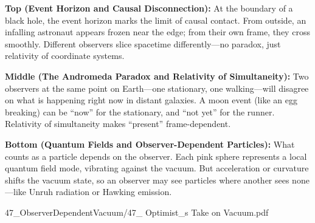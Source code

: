 \begin{SideNotePage}{
  \textbf{Top (Event Horizon and Causal Disconnection):}  
  At the boundary of a black hole, the event horizon marks the limit of causal contact. From outside, an infalling astronaut appears frozen near the edge; from their own frame, they cross smoothly. Different observers slice spacetime differently—no paradox, just relativity of coordinate systems. \par

  \textbf{Middle (The Andromeda Paradox and Relativity of Simultaneity):}  
  Two observers at the same point on Earth—one stationary, one walking—will disagree on what is happening right now in distant galaxies. A moon event (like an egg breaking) can be “now” for the stationary, and “not yet” for the runner. Relativity of simultaneity makes “present” frame-dependent. \par

  \textbf{Bottom (Quantum Fields and Observer-Dependent Particles):}  
  What counts as a particle depends on the observer. Each pink sphere represents a local quantum field mode, vibrating against the vacuum. But acceleration or curvature shifts the vacuum state, so an observer may see particles where another sees none—like Unruh radiation or Hawking emission. \par

}{47_ObserverDependentVacuum/47_ Optimist_s Take on Vacuum.pdf}
\end{SideNotePage}

